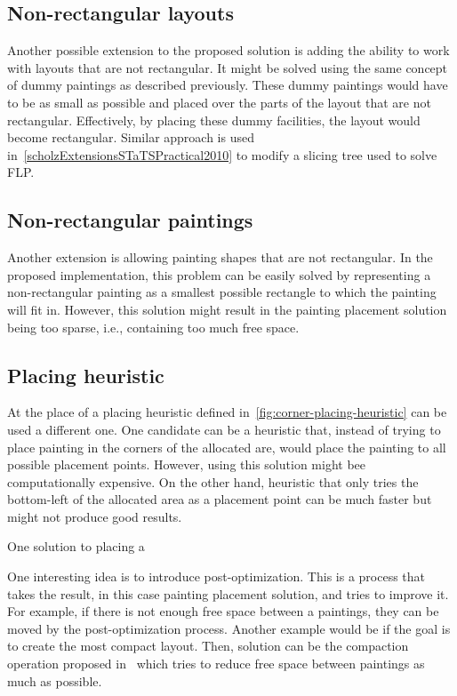 \subsection{Non-rectangular layouts}\label{subsec:non-rectangular-layouts}


Another possible extension to the proposed solution is adding the ability to work
with layouts that are not rectangular.
It might be solved using the same concept of dummy paintings as described previously.
These dummy paintings would have to be as small as possible and placed over the
parts of the layout that are not rectangular.
Effectively, by placing these dummy facilities, the layout would become rectangular.
Similar approach is used in~\ref{scholzExtensionsSTaTSPractical2010} to modify a slicing tree used to solve FLP.

\subsection{Non-rectangular paintings}\label{subsec:non-rectangular-paintings}

Another extension is allowing painting shapes that are not rectangular.
In the proposed implementation, this problem can be easily solved by representing
a non-rectangular painting as a smallest possible rectangle to which the painting will fit in.
However, this solution might result in the painting placement solution being too sparse,
i.e., containing too much free space.

\subsection{Placing heuristic}\label{subsec:placing-heuristic}

At the place of a placing heuristic defined in~\ref{fig:corner-placing-heuristic} can be used a different one.
One candidate can be a heuristic that, instead of trying to place painting in the corners of the allocated are,
would place the painting to all possible placement points.
However, using this solution might bee computationally expensive.
On the other hand, heuristic that only tries the bottom-left of the allocated area as a placement point can be much faster but
might not produce good results.

One solution to placing a


One interesting idea is to introduce post-optimization.
This is a process that takes the result, in this case painting placement solution,
and tries to improve it.
For example, if there is not enough free space between a paintings, they can be moved by the post-optimization process.
Another example would be if the goal is to create the most compact layout.
Then, solution can be the compaction operation proposed in~\cite{laiSlicingTreeComplete2001}
which tries to reduce free space between paintings as much as possible.

